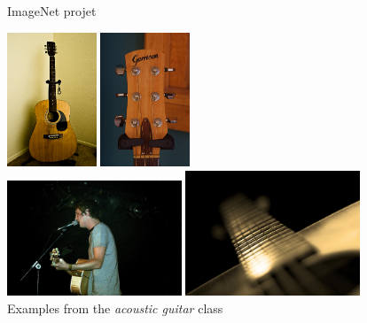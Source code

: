 \documentclass[xcolor=pdftex,dvipsnames,table,mathserif]{beamer}
\begin{document}
\begin{frame}{ImageNet projet}

  \centering
  \includegraphics[width=0.20\textwidth]{ilsvrc_guitar2}\hspace{0.1em}
  \includegraphics[width=0.20\textwidth]{ilsvrc_guitar3}\\
  \includegraphics[width=0.39\textwidth]{ilsvrc_guitar1}\hspace{0.1em}
  \includegraphics[width=0.39\textwidth]{ilsvrc_guitar4}\\
  Examples from the \emph{acoustic guitar} class


\end{frame}
\end{document}
